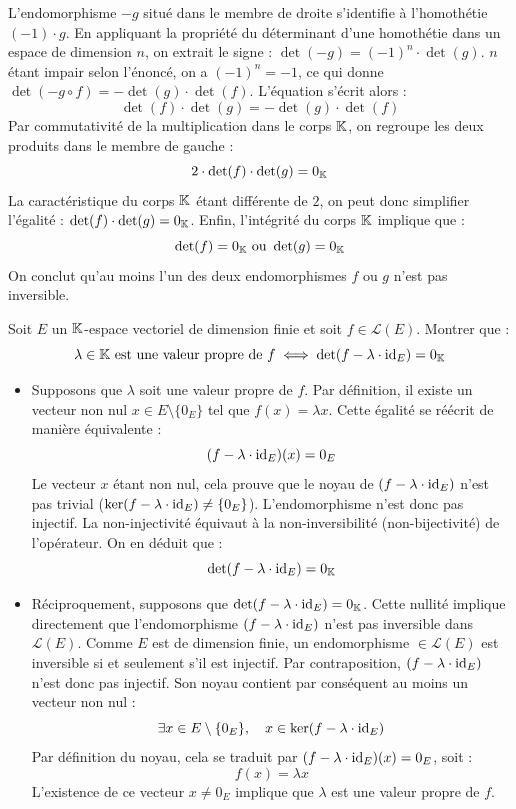 \documentclass[12pt, a4paper]{report}
\begin{document}
L'endomorphisme $-g$ situé dans le membre de droite s'identifie à l'homothétie $(-1) \cdot g$. En appliquant la propriété du déterminant d'une homothétie dans un espace de dimension $n$, on extrait le signe : $\det(-g) = (-1)^n \cdot \det(g)$. $n$ étant impair selon l'énoncé, on a $(-1)^n = -1$, ce qui donne $\det(-g \circ f) = -\det(g) \cdot \det(f)$. L'équation s'écrit alors :
$$\det(f) \cdot \det(g) = -\det(g) \cdot \det(f)$$
Par commutativité de la multiplication dans le corps $\mathbb{K}$, on regroupe les deux produits dans le membre de gauche :
$$2 \cdot \det(f) \cdot \det(g) = 0_{\mathbb{K}}$$
La caractéristique du corps $\mathbb{K}$ étant différente de $2$, on peut donc simplifier l'égalité : $\det(f) \cdot \det(g) = 0_{\mathbb{K}}$. Enfin, l'intégrité du corps $\mathbb{K}$ implique que : 
$$\det(f) = 0_{\mathbb{K}} \text{ ou } \det(g) = 0_{\mathbb{K}}$$
On conclut qu'au moins l'un des deux endomorphismes $f$ ou $g$ n'est pas inversible.

\begin{exercise}
    Soit $E$ un $\mathbb{K}$-espace vectoriel de dimension finie et soit $f \in \mathcal{L}(E)$. Montrer que :
    $$\lambda \in \mathbb{K} \text{ est une valeur propre de } f \iff \det(f - \lambda \cdot \mathrm{id}_E) = 0_{\mathbb{K}}$$
\end{exercise}

\begin{itemize}
    \item[$\implies$] Supposons que $\lambda$ soit une valeur propre de $f$. Par définition, il existe un vecteur non nul $x \in E \setminus \{0_E\}$ tel que $f(x) = \lambda x$. 
    Cette égalité se réécrit de manière équivalente :
    $$(f - \lambda \cdot \mathrm{id}_E)(x) = 0_E$$
    Le vecteur $x$ étant non nul, cela prouve que le noyau de $(f - \lambda \cdot \mathrm{id}_E)$ n'est pas trivial ($\ker(f - \lambda \cdot \mathrm{id}_E) \neq \{0_E\}$). L'endomorphisme n'est donc pas injectif. 
    La non-injectivité équivaut à la non-inversibilité (non-bijectivité) de l'opérateur. On en déduit que :
    $$\det(f - \lambda \cdot \mathrm{id}_E) = 0_{\mathbb{K}}$$

    \item[$\impliedby$] Réciproquement, supposons que $\det(f - \lambda \cdot \mathrm{id}_E) = 0_{\mathbb{K}}$.
    Cette nullité implique directement que l'endomorphisme $(f - \lambda \cdot \mathrm{id}_E)$ n'est pas inversible dans $\mathcal{L}(E)$.
    Comme $E$ est de dimension finie, un endomorphisme $\in \mathcal L(E)$ est inversible si et seulement s'il est injectif. Par contraposition, $(f - \lambda \cdot \mathrm{id}_E)$ n'est donc pas injectif. Son noyau contient par conséquent au moins un vecteur non nul :
    $$\exists x \in E \setminus \{0_E\}, \quad x \in \ker(f - \lambda \cdot \mathrm{id}_E)$$
    Par définition du noyau, cela se traduit par $(f - \lambda \cdot \mathrm{id}_E)(x) = 0_E$, soit :
    $$f(x) = \lambda x$$
    L'existence de ce vecteur $x \neq 0_E$ implique que $\lambda$ est une valeur propre de $f$.
\end{itemize}
\end{document}
